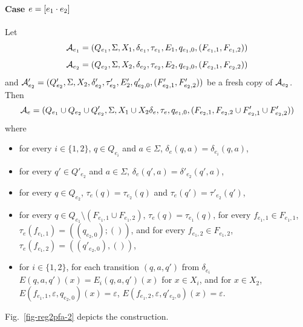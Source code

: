 \paragraph{Case $e = [e_1 \cdot e_2]$} 
Let 
\[\mathcal{A}_{e_1} = (Q_{e_1}, \Sigma, X_1, \delta_{e_1}, \tau_{e_1}, E_1, q_{e_1,0}, (F_{e_1,1}, F_{e_1,2}))\]
%
\[\mathcal{A}_{e_2} = (Q_{e_2}, \Sigma, X_2, \delta_{e_2}, \tau_{e_2}, E_2, q_{e_2,0}, (F_{e_2, 1}, F_{e_2,2}))\] and
%
$\mathcal{A}'_{e_2} = (Q'_{e_2}, \Sigma, X_2, \delta'_{e_2}, \tau'_{e_2}, E_2', q'_{e_2,0}, (F'_{e_2, 1}, F'_{e_2,2}))$ be a fresh copy of $\mathcal{A}_{e_2}$. Then 
%
\[\mathcal{A}_e = ( Q_{e_1} \cup Q_{e_2} \cup Q'_{e_2}, \Sigma, X_1\cup X_2 \delta_e, \tau_e, q_{e_1,0}, (F_{e_2,1}, F_{e_2,2} \cup F'_{e_2,1} \cup F'_{e_2,2}))\] where 
	\begin{itemize}
	 \item for every $i \in \{1,2\}$, $q \in Q_{e_i}$ and $a \in \Sigma$, $\delta_e(q, a) = \delta_{e_i}(q, a)$,
	\item for every $q' \in Q'_{e_2}$ and $a \in \Sigma$, $\delta_e(q', a) = \delta'_{e_2}(q',a)$, 
	\item for every $q \in Q_{e_2}$, $\tau_e(q) = \tau_{e_2}(q)$ and $\tau_e(q') = \tau'_{e_2}(q')$, 
	\item for every $q \in Q_{e_1} \setminus (F_{e_1,1} \cup F_{e_1,2})$, $\tau_e(q) = \tau_{e_1}(q)$, for every $f_{e_1,1} \in F_{e_1,1}$, $\tau_e(f_{e_1,1}) = ((q_{e_2,0}); ())$, and for every $f_{e_1,2} \in F_{e_1,2}$, $\tau_e(f_{e_1,2}) = ((q'_{e_2,0}), ())$,
	\item for $i\in \{1,2\}$, for each transition $(q, a, q')$ from $\delta_{e_i}$  $E(q,a,q')(x) = E_i(q,a,q')(x)$ for $x\in X_i$, and for $x\in X_2$, $E(f_{e_1,1},\varepsilon,q_{e_2,0})(x) =\varepsilon$, $E(f_{e_1,2},\varepsilon,q'_{e_2,0})(x) =\varepsilon$.
  \end{itemize}
 Fig.~\ref{fig-reg2pfa-2} depicts the construction. 
